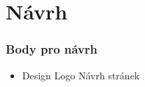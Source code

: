 
\chapter{Návrh}

\subsection{Body pro návrh}
\begin{itemize}
    \item Design
    \subitem Logo
    \subitem Návrh stránek
\end{itemize}

